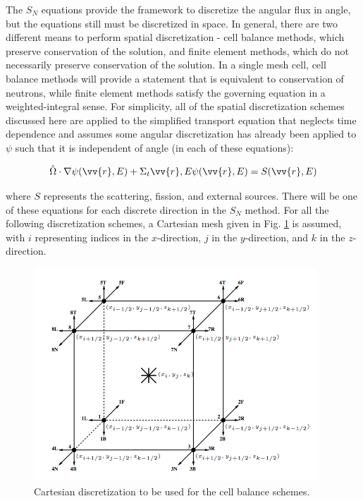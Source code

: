 The \(S_N\) equations provide the framework to discretize the angular flux in angle, but the equations still must be discretized in space. In general, there are two different means to perform spatial discretization - cell balance methods, which preserve conservation of the solution, and finite element methods, which do not necessarily preserve conservation of the solution. In a single mesh cell, cell balance methods will provide a statement that is equivalent to conservation of neutrons, while finite element methods satisfy the governing equation in a weighted-integral sense. For simplicity, all of the spatial discretization schemes discussed here are applied to the simplified transport equation that neglects time dependence and assumes some angular discretization has already been applied to \(\psi\) such that it is independent of angle (in each of these equations):

\begin{equation}
\label{eq:SimpleTE}
\hO  \cdot\nabla\psi(\vv{r},E)+\Sigma_t{\vv{r},E}\psi(\vv{r},E)=S(\vv{r},E)
\end{equation}

where \(S\) represents the scattering, fission, and external sources. There will be one of these equations for each discrete direction in the \(S_N\) method. For all the following discretization schemes, a Cartesian mesh given in Fig. \ref{fig:CartesianDiscretization} is assumed, with \(i\) representing indices in the \(x\)-direction, \(j\) in the \(y\)-direction, and \(k\) in the \(z\)-direction.

\begin{figure}[H]
\centering
\includegraphics[width=0.6\linewidth]{figures/CartesianDiscretization.jpg}
\caption{Cartesian discretization to be used for the cell balance schemes.}
\label{fig:CartesianDiscretization}
\end{figure}


